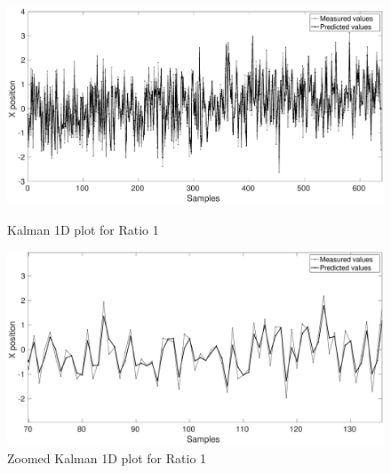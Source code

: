 \documentclass[12pt]{article}
\begin{document}
\begin{figure}[h]
\centering
\begin{minipage}{0.5\textwidth}
\centering
	\includegraphics[width = \textwidth]{./Figures/part1Ratio1.eps}
	\caption{Kalman 1D plot for Ratio 1}
	\label{fig:kalman 1D Rat1}
\end{minipage}%
\begin{minipage}{0.5\textwidth}
\centering
	\includegraphics[width = \textwidth]{./Figures/part1Ratio1zoomed.eps}
	\caption{ Zoomed Kalman 1D plot for Ratio 1}
	\label{fig: kalman 1D Rat1 zoom}
\end{minipage}
\end{figure}
\end{document}
